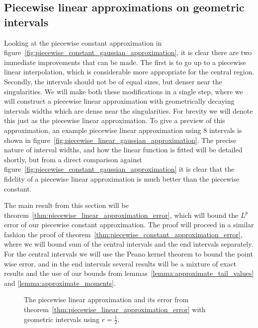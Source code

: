 \documentclass[manuscript,review]{acmart}
\begin{document}
\subsection{Piecewise linear approximations on geometric intervals}
\label{sec:piecewise_linear_approximations_on_geometric_intervals}

Looking at the piecewise constant approximation in figure~\ref{fig:piecewise_constant_gaussian_approximation}, it is clear there are two immediate improvements that can be made. The first is to go up to a piecewise linear interpolation, which is considerable more appropriate for the central region. Secondly, the intervals should not be of equal sizes, but denser near the singularities. We will make both these modifications in a single step, where we will construct a piecewise linear approximation with geometrically decaying intervals widths which are dense near the singularities. For brevity we will denote this just as the piecewise linear approximation. To give a preview of this approximation, an example piecewise linear approximation using 8 intervals is shown in figure~\ref{fig:piecewise_linear_gaussian_approximation}. The precise nature of interval widths, and how the linear function is fitted will be detailed shortly, but from a direct comparison against figure~\ref{fig:piecewise_constant_gaussian_approximation} it is clear that the fidelity of a piecewise linear approximation is much better than the piecewise constant. 

The main result from this section will be theorem~\ref{thm:piecewise_linear_approximation_error}, which will bound the $ L^p $ error of our piecewise constant approximation. The proof will proceed in a similar fashion the proof of theorem~\ref{thm:piecewise_constant_approximation_error}, where we will bound sum of the central intervals and the end intervals separately. For the central intervals we will use the Peano kernel theorem to bound the point wise error, and in the end intervals several results will be a mixture of exact results and the use of our bounds from lemmas~\ref{lemma:approximate_tail_values} and \ref{lemma:approximate_moments}.

\begin{figure}[htb]
\centering

\hfill
{} \hfill 
{}\hfill

\caption{The piecewise linear approximation and its error from theorem~\ref{thm:piecewise_linear_approximation_error} with geometric intervals using $ r = \tfrac{1}{2} $.}
\label{fig:piecewise_linear_approximation}
\end{figure}
\end{document}
